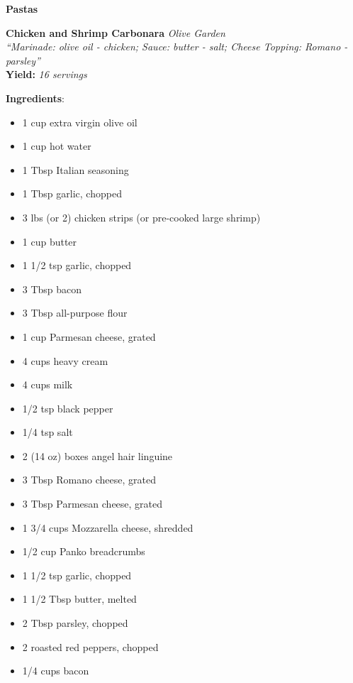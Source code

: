 \documentclass[11pt, twoside, openany]{book}
\begin{document}
{\newpage \LARGE \textbf{Pastas}} \label{pastas}\vspace{4mm}\\
\noindent\begin{minipage}[t]{\linewidth}%
{\Large\textbf{Chicken and Shrimp Carbonara}} \label{chicken-and-shrimp-carbonara}\hfill\textit{Olive Garden}\\
\textit{``Marinade: olive oil - chicken; Sauce: butter - salt; Cheese Topping: Romano - parsley''}\\
\textbf{Yield:} \textit{16 servings}\\
\noindent\begin{minipage}[t]{0.78\linewidth}%
\textbf{Ingredients}:\vspace{-3mm}
\begin{multicols}{2}
\begin{itemize}\setlength\itemsep{-1mm}
\item 1 cup extra virgin olive oil
\item 1 cup hot water
\item 1 Tbsp Italian seasoning
\item 1 Tbsp garlic, chopped
\item 3 lbs (or 2) chicken strips (or pre-cooked large shrimp)
\item 1 cup butter
\item 1 1/2 tsp garlic, chopped
\item 3 Tbsp bacon
\item 3 Tbsp all-purpose flour
\item 1 cup Parmesan cheese, grated
\item 4 cups heavy cream
\item 4 cups milk
\item 1/2 tsp black pepper
\item 1/4 tsp salt
\item 2 (14 oz) boxes angel hair linguine
\item 3 Tbsp Romano cheese, grated
\item 3 Tbsp Parmesan cheese, grated
\item 1 3/4 cups Mozzarella cheese, shredded
\item 1/2 cup Panko breadcrumbs
\item 1 1/2 tsp garlic, chopped
\item 1 1/2 Tbsp butter, melted
\item 2 Tbsp parsley, chopped
\item 2 roasted red peppers, chopped
\item 1/4 cups bacon

\end{itemize}
\end{multicols}
\end{minipage}
\end{minipage}
\end{document}
